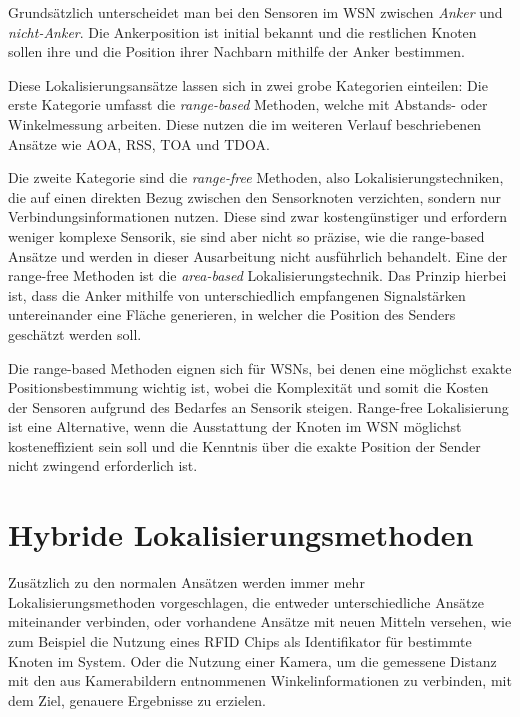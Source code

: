 \documentclass[12pt, a4wide]{scrreprt}
\begin{document}
Grundsätzlich unterscheidet man bei den Sensoren im WSN zwischen \textit{Anker} und \textit{nicht-Anker}. Die Ankerposition ist initial bekannt und die restlichen Knoten sollen ihre und die Position ihrer Nachbarn mithilfe der Anker bestimmen.

Diese Lokalisierungsansätze lassen sich in zwei grobe Kategorien einteilen\cite{area_based}: Die erste Kategorie umfasst die \textit{range-based} Methoden, welche mit Abstands- oder Winkelmessung arbeiten. Diese nutzen die im weiteren Verlauf beschriebenen Ansätze wie \ac{AOA}, \ac{RSS}, \ac{TOA} und \ac{TDOA}.

Die zweite Kategorie sind die \textit{range-free} Methoden, also Lokalisierungstechniken, die auf einen direkten Bezug zwischen den Sensorknoten verzichten, sondern nur Verbindungsinformationen nutzen. Diese sind zwar kostengünstiger und erfordern weniger komplexe Sensorik, sie sind aber nicht so präzise, wie die range-based Ansätze und werden in dieser Ausarbeitung nicht ausführlich behandelt. Eine der range-free Methoden ist die \textit{area-based}\cite{area_based} Lokalisierungstechnik. Das Prinzip hierbei ist, dass die Anker mithilfe von unterschiedlich empfangenen Signalstärken untereinander eine Fläche generieren, in welcher die Position des Senders geschätzt werden soll.

Die range-based Methoden eignen sich für WSNs, bei denen eine möglichst exakte Positionsbestimmung wichtig ist, wobei die Komplexität und somit die Kosten der Sensoren aufgrund des Bedarfes an Sensorik steigen. Range-free Lokalisierung ist eine Alternative, wenn die Ausstattung der Knoten im WSN möglichst kosteneffizient sein soll und die Kenntnis über die exakte Position der Sender nicht zwingend erforderlich ist.

\section{Hybride Lokalisierungsmethoden}
Zusätzlich zu den normalen Ansätzen werden immer mehr Lokalisierungsmethoden vorgeschlagen, die entweder unterschiedliche Ansätze miteinander verbinden\cite{rss-doa}, oder vorhandene Ansätze mit neuen Mitteln versehen, wie zum Beispiel die Nutzung eines RFID Chips als Identifikator für bestimmte Knoten im System\cite{rfid}. Oder die Nutzung einer Kamera, um die gemessene Distanz mit den aus Kamerabildern entnommenen Winkelinformationen zu verbinden, mit dem Ziel, genauere Ergebnisse zu erzielen\cite{range-video}.\\
\end{document}
